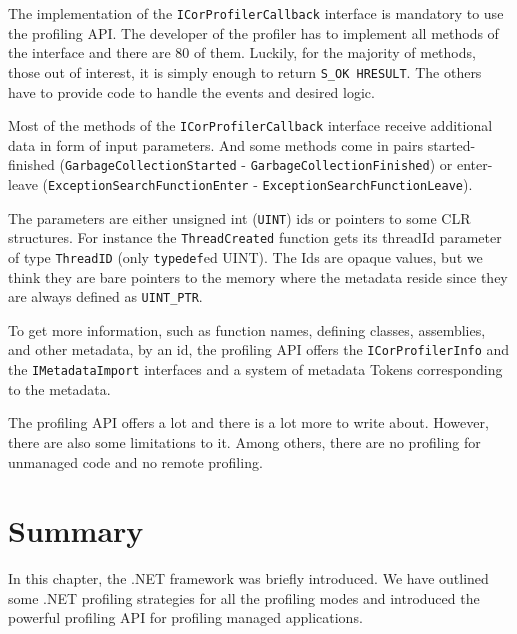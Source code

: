 The implementation of the \texttt{ICorProfilerCallback} interface is mandatory to use the profiling API. The developer of the profiler has to implement all methods of the interface and there are 80 of them. Luckily, for the majority of methods, those out of interest, it is simply enough to return \texttt{S\_OK HRESULT}. The others have to provide code to handle the events and desired logic.

Most of the methods of the \texttt{ICorProfilerCallback} interface receive additional data in form of input parameters. And some methods come in pairs started-finished \linebreak(\texttt{GarbageCollectionStarted} - \texttt{GarbageCollectionFinished}) or enter-leave \linebreak(\texttt{ExceptionSearchFunctionEnter} -  \texttt{ExceptionSearchFunctionLeave}). 

The parameters are either unsigned int (\texttt{UINT}) ids or pointers to some CLR structures. For instance the \texttt{ThreadCreated} function gets its threadId parameter of type \texttt{ThreadID} (only \texttt{typedef}ed UINT). The Ids are opaque values, but we think they are bare pointers to the memory where the metadata reside since they are always defined as \texttt{UINT\_PTR}.

To get more information, such as function names, defining classes, assemblies, and other metadata, by an id, the profiling API offers the \texttt{ICorProfilerInfo} and the \texttt{IMetadataImport} interfaces and a system of metadata Tokens corresponding to the metadata.

The profiling API offers a lot and there is a lot more to write about. However, there are also some limitations to it. Among others, there are no profiling for unmanaged code and no remote profiling. 

\section{Summary}
In this chapter, the .NET framework was briefly introduced. We have outlined some .NET profiling strategies for all the profiling modes and introduced the powerful profiling API for profiling managed applications.
